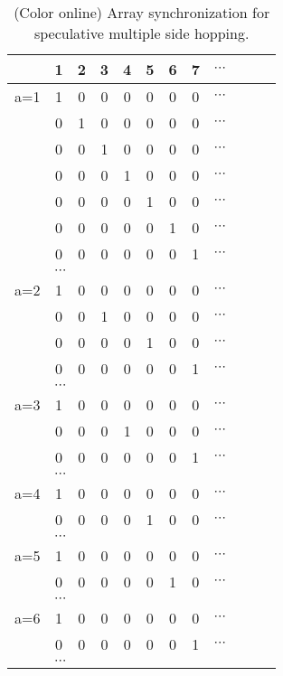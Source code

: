 \documentclass[%
  preprint,
 showpacs,
 showkeys,
 preprintnumbers,
 amsmath,amssymb,
 aps,
  pra,
  longbibliography,
 ]{revtex4-1}
\begin{document}
\begin{table}
\begin{center}
\begin{tabular}{c|ccccccccccc}
\hline\hline
&1&2&3&4&5&6&7&$\cdots$\\
\hline
\color{red}
a=1
&\color{red}1&0&0&0&0&0&0&$\cdots$\\
&0&\color{red}1&0&0&0&0&0&$\cdots$\\
&0&0&\color{red}1&0&0&0&0&$\cdots$\\
&0&0&0&\color{red}1&0&0&0&$\cdots$\\
&0&0&0&0&\color{red}1&0&0&$\cdots$\\
&0&0&0&0&0&\color{red}1&0&$\cdots$\\
&0&0&0&0&0&0&\color{red}1&$\cdots$\\
&\multicolumn{8}{l}{$\cdots$}\\
\hline
\color{blue}
a=2
&\color{blue}1&0&0&0&0&0&0&$\cdots$\\
&0&0&\color{blue}1&0&0&0&0&$\cdots$\\
&0&0&0&0&\color{blue}1&0&0&$\cdots$\\
&0&0&0&0&0&0&\color{blue}1&$\cdots$\\
&\multicolumn{8}{l}{$\cdots$}\\
\hline
\color{green}
a=3
&\color{green}1&0&0&0&0&0&0&$\cdots$\\
&0&0&0&\color{green}1&0&0&0&$\cdots$\\
&0&0&0&0&0&0&\color{green}1&$\cdots$\\
&\multicolumn{8}{l}{$\cdots$}\\
\hline
\color{olive}
a=4
&\color{olive}1&0&0&0&0&0&0&$\cdots$\\
&0&0&0&0&\color{olive}1&0&0&$\cdots$\\
&\multicolumn{8}{l}{$\cdots$}\\
\hline
\color{orange}
a=5
&\color{orange}1&0&0&0&0&0&0&$\cdots$\\
&0&0&0&0&0&\color{orange}1&0&$\cdots$\\
&\multicolumn{8}{l}{$\cdots$}\\
\hline
\color{violet}
a=6
&\color{violet}1&0&0&0&0&0&0&$\cdots$\\
&0&0&0&0&0&0&\color{violet}1&$\cdots$\\
&\multicolumn{8}{l}{$\cdots$}\\
\hline\hline
\end{tabular}
\end{center}
\caption{(Color online) Array synchronization for speculative multiple side hopping.}
\label{2013-tablest1-msh}
\end{table}
\end{document}
